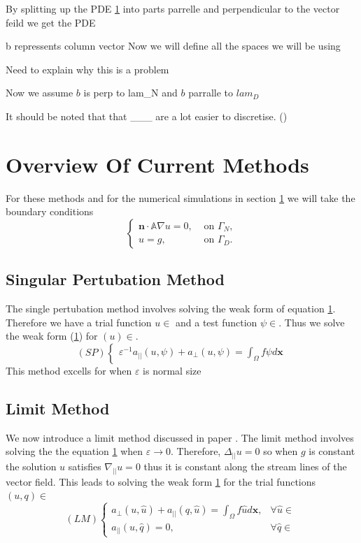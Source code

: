\documentclass[12pt,a4paper]{article}
\begin{document}
By splitting up the PDE \ref{} into parts parrelle and perpendicular to the vector feild we get the PDE 

b repressents column vector 
Now we will define all the spaces we will be using

Need to explain why this is a problem

Now we assume $b$ is perp to lam_N and $b$ parralle to $lam_D$

It should be noted that that ___ are a lot easier to discretise. ()

\section{Overview Of Current Methods}
For these methods and for the numerical simulations in section \ref{} we will take the boundary conditions
\begin{equation}
\begin{cases}
\mathbf{n}\cdot \mathbb{A}\nabla u = 0, & \text{ on }\Gamma_N, \\
u = g, & \text{  on }\Gamma_D.
\end{cases}
\end{equation}

\subsection{Singular Pertubation Method} \label{SP}
The single pertubation method involves solving the weak form of equation \ref{}. Therefore we have a trial function $u \in $ and a test function $\psi \in$. Thus we solve the weak form (\ref{}) for $(u) \in $.
\begin{equation}
(SP)
\begin{cases}
\varepsilon^{-1}a_{||}(u, \psi) + a_{\perp}(u, \psi) = \int_{\Omega} f \psi d\mathbf{x}
\end{cases}
\end{equation}
This method excells for when $\varepsilon$ is normal size

\subsection{Limit Method} \label{LM}
We now introduce a limit method discussed in paper \cite{}. The limit method involves solving the the equation \ref{} when $\varepsilon \rightarrow 0$. Therefore, $\Delta_{||}u=0$ so when $g$ is constant the solution $u$ satisfies $\nabla_{||}u=0$ thus it is constant along the stream lines of the vector field. This leads to solving the weak form \ref{} for the trial functions $(u, q) \in $ 
\begin{equation}
(LM)
\begin{cases}
a_{\perp}(u, \hat{u}) + a_{||}(q, \hat{u}) = \int_{\Omega} f \hat{u} d\mathbf{x}, 
&\forall \hat{u} \in \\
a_{||}(u, \hat{q}) = 0, & \forall \hat{q} \in 
\end{cases}
\end{equation}
\end{document}
